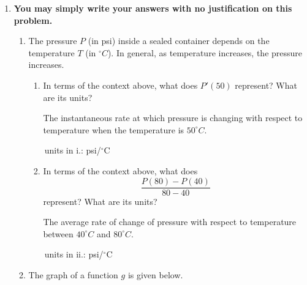 \documentclass[11pt]{article}
\begin{document}
\begin{enumerate}
\newpage

\item {\bf You may simply write your answers with no justification on this problem.}

\begin{enumerate}
    \item The pressure $P$ (in psi) inside a sealed container depends on the temperature $T$ (in ${}^{\circ}\!C$). In general, as temperature increases, the pressure increases.
    \begin{enumerate}
        \item In terms of the context above, what does $P'(50)$ represent? What are its units?

    \vspace{1cm}
    {\color{blue}The instantaneous rate at which pressure is changing with respect to temperature when the temperature is $50^\circ C$.}

        \,\hfill units in i.: {\color{blue}psi/$^\circ$C}
    

        \item In terms of the context above, what does 
        \[
        \frac{P(80)-P(40)}{80-40}
        \]
        represent? What are its units?
        
    \vspace{1cm}
     {\color{blue}The average rate of change of pressure with respect to temperature between $40^\circ C$ and $80^\circ C$.}
    
        \,\hfill units in ii.: {\color{blue}psi/$^\circ$C}
        
    \end{enumerate}

    \item[(b)] The graph of a function $g$ is given below.
\end{enumerate}

\begin{minipage}[t][2.75in][t]{0.35\textwidth}
\end{minipage}
\end{enumerate}
\end{document}
